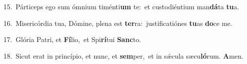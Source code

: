 {\numbfont\textcolor{\numbcolor}{15.}}~Párticeps ego sum ómnium timénti\textbf{um} te:~\star et custodiéntium man\-\textbf{dá}\-ta \textbf{tu}\-a.\par
{\numbfont\textcolor{\numbcolor}{16.}}~Misericórdia tua, Dómine, plena est \textbf{ter}\-ra:~\star justificatiónes \textbf{tu}\-as \textbf{do}\-ce me.\par
{\numbfont\textcolor{\numbcolor}{17.}}~Glória Patri, et \textbf{Fí}\-lio,~\star et Spi\-\textbf{rí}\-tui \textbf{Sanc}\-to.\par
{\numbfont\textcolor{\numbcolor}{18.}}~Sicut erat in princípio, et nunc, et \textbf{sem}\-per,~\star et in sǽcula sæcu\-\textbf{ló}\-rum. \textbf{A}\-men.\par

